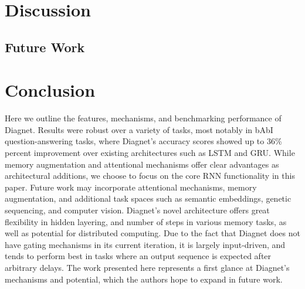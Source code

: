 \documentclass{article}
\begin{document}
\section{Discussion}
\subsection{Future Work}
\section{Conclusion}
Here we outline the features, mechanisms, and benchmarking performance of Diagnet. Results were robust over a variety of tasks, most notably in bAbI question-answering tasks, where Diagnet’s accuracy scores showed up to 36\% percent improvement over existing architectures such as LSTM and GRU.  While memory augmentation and attentional mechanisms offer clear advantages as architectural additions, we choose to focus on the core RNN functionality in this paper.  Future work may incorporate attentional mechanisms, memory augmentation, and additional task spaces such as semantic embeddings, genetic sequencing, and computer vision.  Diagnet’s novel architecture offers great flexibility in hidden layering, and number of steps in various memory tasks, as well as potential for distributed computing.  Due to the fact that Diagnet does not have gating mechanisms in its current iteration, it is largely input-driven, and tends to perform best in tasks where an output sequence is expected after arbitrary delays. The work presented here represents a first glance at Diagnet’s mechanisms and potential, which the authors hope to expand in future work. 


\end{document}
